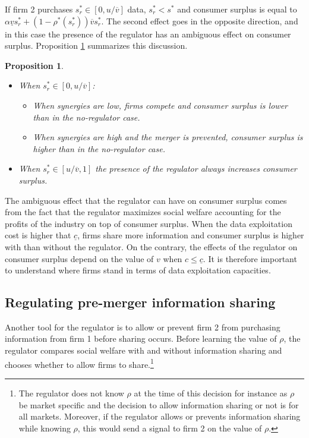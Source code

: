 \documentclass[a4paper,leqno]{article}%
\newtheorem{prop}{Proposition}
\renewcommand{\a}{\alpha}
\newcommand{\uv}{\underline{v}}
\newcommand{\ov}{\overline{v}}
\begin{document}
\medskip

If firm 2 purchases $s_r^*\in[0,u/\ov]$ data, $s_r^*<s^*$ and consumer surplus is equal to $\a \uv s_r^*+(1-\rho^*(s_r^*))\ov s_r^*$. The second effect goes in the opposite direction, and in this case the presence of the regulator has an ambiguous effect on consumer surplus. Proposition \ref{prop:3} summarizes this discussion.


\medskip

\begin{prop}~~\label{prop:3}

\begin{itemize}
    \item When $s_r^*\in[0,u/\ov]$:
    \begin{itemize}
        \item When synergies are low, firms compete and consumer surplus is lower than in the no-regulator case.
        \item When synergies are high and the merger is prevented, consumer surplus is higher than in the no-regulator case.
    \end{itemize}
    \item When $s_r^*\in[u/\ov,1]$ the presence of the regulator always increases consumer surplus.
\end{itemize}

\end{prop}

\noindent The ambiguous effect that the regulator can have on consumer surplus comes from the fact that the regulator maximizes social welfare accounting for the profits of the industry on top of consumer surplus. When the data exploitation cost is higher that $\underline{c}$, firms share more information and consumer surplus is higher with than without the regulator. On the contrary, the effects of the regulator on consumer surplus depend on the value of $v$ when $c\leq \underline{c}$. It is therefore important to understand where firms stand in terms of data exploitation capacities. 

\medskip

\subsection{Regulating pre-merger information sharing}

Another tool for the regulator is to allow or prevent firm 2 from purchasing information from firm 1 before sharing occurs. Before learning the value of $\rho$, the regulator compares social welfare with and without information sharing and chooses whether to allow firms to share.\footnote{The regulator does not know $\rho$ at the time of this decision for instance as $\rho$ be market specific and the decision to allow information sharing or not is for all markets. Moreover, if the regulator allows or prevents information sharing while knowing $\rho$, this would send a signal to firm 2 on the value of $\rho$.}
\end{document}
